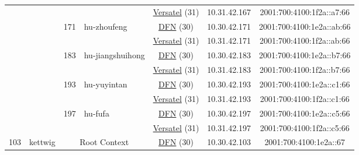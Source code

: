 \begin{small}
\begin{center}
\begin{longtable}{|c|c|c|c|c|c|c|c|}
  &  &  &  & \multicolumn{2}{|c|}{\tiny{\href{http://www.versatel.de}{Versatel} (31)}} & \tiny{10.31.42.167} & \tiny{2001:700:4100:1f2a::a7:66} \\* \cline{3-3}\cline{4-4}\cline{5-5}\cline{6-6}\cline{7-7}\cline{8-8}
  &  & \multirow{2}{*}{\tiny{171}} & \multicolumn{1}{|l|}{\multirow{2}{*}{\tiny{hu-zhoufeng}}} & \multicolumn{2}{|c|}{\tiny{\href{https://www.dfn.de}{DFN} (30)}} & \tiny{10.30.42.171} & \tiny{2001:700:4100:1e2a::ab:66} \\* \cline{5-5}\cline{6-6}\cline{7-7}\cline{8-8}
  &  &  &  & \multicolumn{2}{|c|}{\tiny{\href{http://www.versatel.de}{Versatel} (31)}} & \tiny{10.31.42.171} & \tiny{2001:700:4100:1f2a::ab:66} \\* \cline{3-3}\cline{4-4}\cline{5-5}\cline{6-6}\cline{7-7}\cline{8-8}
  &  & \multirow{2}{*}{\tiny{183}} & \multicolumn{1}{|l|}{\multirow{2}{*}{\tiny{hu-jiangshuihong}}} & \multicolumn{2}{|c|}{\tiny{\href{https://www.dfn.de}{DFN} (30)}} & \tiny{10.30.42.183} & \tiny{2001:700:4100:1e2a::b7:66} \\* \cline{5-5}\cline{6-6}\cline{7-7}\cline{8-8}
  &  &  &  & \multicolumn{2}{|c|}{\tiny{\href{http://www.versatel.de}{Versatel} (31)}} & \tiny{10.31.42.183} & \tiny{2001:700:4100:1f2a::b7:66} \\* \cline{3-3}\cline{4-4}\cline{5-5}\cline{6-6}\cline{7-7}\cline{8-8}
  &  & \multirow{2}{*}{\tiny{193}} & \multicolumn{1}{|l|}{\multirow{2}{*}{\tiny{hu-yuyintan}}} & \multicolumn{2}{|c|}{\tiny{\href{https://www.dfn.de}{DFN} (30)}} & \tiny{10.30.42.193} & \tiny{2001:700:4100:1e2a::c1:66} \\* \cline{5-5}\cline{6-6}\cline{7-7}\cline{8-8}
  &  &  &  & \multicolumn{2}{|c|}{\tiny{\href{http://www.versatel.de}{Versatel} (31)}} & \tiny{10.31.42.193} & \tiny{2001:700:4100:1f2a::c1:66} \\* \cline{3-3}\cline{4-4}\cline{5-5}\cline{6-6}\cline{7-7}\cline{8-8}
  &  & \multirow{2}{*}{\tiny{197}} & \multicolumn{1}{|l|}{\multirow{2}{*}{\tiny{hu-fufa}}} & \multicolumn{2}{|c|}{\tiny{\href{https://www.dfn.de}{DFN} (30)}} & \tiny{10.30.42.197} & \tiny{2001:700:4100:1e2a::c5:66} \\* \cline{5-5}\cline{6-6}\cline{7-7}\cline{8-8}
  &  &  &  & \multicolumn{2}{|c|}{\tiny{\href{http://www.versatel.de}{Versatel} (31)}} & \tiny{10.31.42.197} & \tiny{2001:700:4100:1f2a::c5:66} \\ \hline
 \multirow{32}{*}{\tiny{103}} & \multicolumn{1}{|l|}{\multirow{32}{*}{\tiny{kettwig}}} & \multicolumn{2}{|c|}{\multirow{2}{*}{\tiny{Root Context}}} & \multicolumn{2}{|c|}{\tiny{\href{https://www.dfn.de}{DFN} (30)}} & \tiny{10.30.42.103} & \tiny{2001:700:4100:1e2a::67} \\* \cline{5-5}\cline{6-6}\cline{7-7}\cline{8-8}

\end{longtable}
\end{center}
\end{small}
